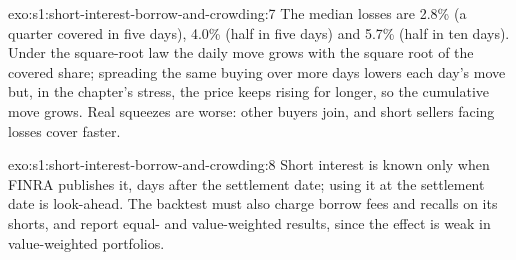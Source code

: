 \begin{solution}{exo:s1:short-interest-borrow-and-crowding:7}
The median losses are 2.8\% (a quarter covered in five days), 4.0\% (half in five days) and 5.7\% (half in ten days). Under the square-root law the daily
move grows with the square root of the covered share; spreading the same buying over more days lowers each day's move but, in the chapter's stress, the
price keeps rising for longer, so the cumulative move grows. Real squeezes are worse: other buyers join, and short sellers facing losses cover faster.
\end{solution}

\begin{solution}{exo:s1:short-interest-borrow-and-crowding:8}
Short interest is known only when FINRA publishes it, days after the settlement date; using it at the settlement date is look-ahead. The backtest must also
charge borrow fees and recalls on its shorts, and report equal- and value-weighted results, since the effect is weak in value-weighted portfolios.
\end{solution}

